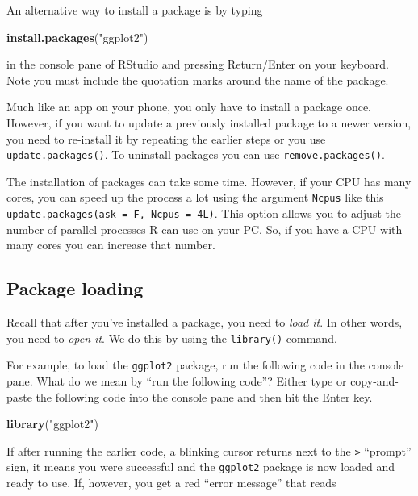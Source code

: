 \documentclass[
  12pt,
  oneside]{book}
\newenvironment{Shaded}{\begin{snugshade}}{\end{snugshade}}
\newcommand{\FunctionTok}[1]{\textcolor[rgb]{0.13,0.29,0.53}{\textbf{#1}}}
\newcommand{\NormalTok}[1]{#1}
\newcommand{\StringTok}[1]{\textcolor[rgb]{0.31,0.60,0.02}{#1}}
\theoremstyle{definition}
\theoremstyle{definition}
\theoremstyle{definition}
\theoremstyle{definition}
\theoremstyle{remark}
\begin{document}
An alternative way to install a package is by typing

\begin{Shaded}
\begin{Highlighting}[]
\FunctionTok{install.packages}\NormalTok{(}\StringTok{"ggplot2"}\NormalTok{)}
\end{Highlighting}
\end{Shaded}

in the console pane of RStudio and pressing Return/Enter on your keyboard. Note you must include the quotation marks around the name of the package.

Much like an app on your phone, you only have to install a package once. However, if you want to update a previously installed package to a newer version, you need to re-install it by repeating the earlier steps or you use \texttt{update.packages()}. To uninstall packages you can use \texttt{remove.packages()}.

The installation of packages can take some time. However, if your CPU has many cores, you can speed up the process a lot using the argument \texttt{Ncpus} like this \texttt{update.packages(ask\ =\ F,\ Ncpus\ =\ 4L)}. This option allows you to adjust the number of parallel processes R can use on your PC. So, if you have a CPU with many cores you can increase that number.

\hypertarget{package-loading}{%
\subsection{Package loading}\label{package-loading}}

Recall that after you've installed a package, you need to \emph{load it}. In other words, you need to \emph{open it}. We do this by using the \texttt{library()} command. 

For example, to load the \texttt{ggplot2} package, run the following code in the console pane. What do we mean by ``run the following code''? Either type or copy-and-paste the following code into the console pane and then hit the Enter key.

\begin{Shaded}
\begin{Highlighting}[]
\FunctionTok{library}\NormalTok{(}\StringTok{"ggplot2"}\NormalTok{)}
\end{Highlighting}
\end{Shaded}

If after running the earlier code, a blinking cursor returns next to the \texttt{\textgreater{}} ``prompt'' sign, it means you were successful and the \texttt{ggplot2} package is now loaded and ready to use. If, however, you get a red ``error message'' that reads
\end{document}
